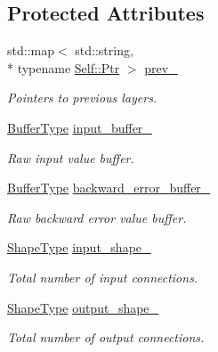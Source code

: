 \subsection*{Protected Attributes}
\begin{DoxyCompactItemize}
\item 
std\-::map$<$ std\-::string, \\*
typename \hyperlink{classffnn_1_1layer_1_1_layer_ac336e7cc01ccf0117c5a4a2baf98add4}{Self\-::\-Ptr} $>$ \hyperlink{classffnn_1_1layer_1_1_layer_abe139156722efe30288b00becbd52cb9}{prev\-\_\-}
\begin{DoxyCompactList}\small\item\em Pointers to previous layers. \end{DoxyCompactList}\item 
\hyperlink{classffnn_1_1layer_1_1_layer_ad9cab24dbd0cbed2febed5b635f81722}{Buffer\-Type} \hyperlink{classffnn_1_1layer_1_1_layer_ad4b5ac0708d6ada04d62df4fad377f1a}{input\-\_\-buffer\-\_\-}
\begin{DoxyCompactList}\small\item\em Raw input value buffer. \end{DoxyCompactList}\item 
\hyperlink{classffnn_1_1layer_1_1_layer_ad9cab24dbd0cbed2febed5b635f81722}{Buffer\-Type} \hyperlink{classffnn_1_1layer_1_1_layer_a79d676e9b8bd04d1a438266206d4b321}{backward\-\_\-error\-\_\-buffer\-\_\-}
\begin{DoxyCompactList}\small\item\em Raw backward error value buffer. \end{DoxyCompactList}\item 
\hyperlink{classffnn_1_1layer_1_1_layer_ab80478345a2579402ae086a2f7de1ca2}{Shape\-Type} \hyperlink{classffnn_1_1layer_1_1_layer_a07cc49b6890743a8045e3adc7c07aca5}{input\-\_\-shape\-\_\-}
\begin{DoxyCompactList}\small\item\em Total number of input connections. \end{DoxyCompactList}\item 
\hyperlink{classffnn_1_1layer_1_1_layer_ab80478345a2579402ae086a2f7de1ca2}{Shape\-Type} \hyperlink{classffnn_1_1layer_1_1_layer_a453330bda96277cd7b794bfab4804c47}{output\-\_\-shape\-\_\-}
\begin{DoxyCompactList}\small\item\em Total number of output connections. \end{DoxyCompactList}\item 

\end{DoxyCompactItemize}
